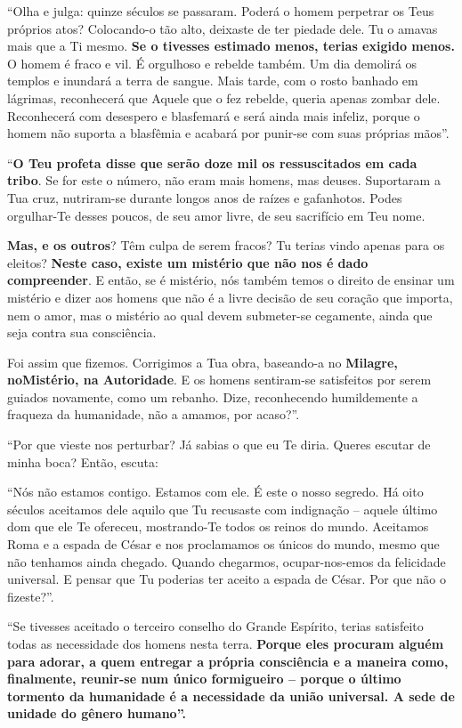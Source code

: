 ``Olha e julga: quinze séculos se passaram. Poderá o homem perpetrar os
Teus próprios atos? Colocando-o tão alto, deixaste de ter piedade dele.
Tu o amavas mais que a Ti mesmo. \textbf{Se o tivesses estimado menos,
terias exigido menos.} O homem é fraco e vil. É orgulhoso e rebelde
também. Um dia demolirá os templos e inundará a terra de sangue. Mais
tarde, com o rosto banhado em lágrimas, reconhecerá que Aquele que o fez
rebelde, queria apenas zombar dele. Reconhecerá com desespero e
blasfemará e será ainda mais infeliz, porque o homem não suporta a
blasfêmia e acabará por punir-se com suas próprias mãos''.

``\textbf{O Teu profeta disse que serão doze mil os ressuscitados em
cada tribo}. Se for este o número, não eram mais homens, mas deuses.
Suportaram a Tua cruz, nutriram-se durante longos anos de raízes e
gafanhotos. Podes orgulhar-Te desses poucos, de seu amor livre, de seu
sacrifício em Teu nome.

\textbf{Mas, e os outros}? Têm culpa de serem fracos? Tu terias vindo
apenas para os eleitos? \textbf{Neste caso, existe um mistério que não
nos é dado compreender}. E então, se é mistério, nós também temos o
direito de ensinar um mistério e dizer aos homens que não é a livre
decisão de seu coração que importa, nem o amor, mas o mistério ao qual
devem submeter-se cegamente, ainda que seja contra sua consciência.

Foi assim que fizemos. Corrigimos a Tua obra, baseando-a no
\textbf{Milagre, noMistério, na Autoridade}. E os homens sentiram-se
satisfeitos por serem guiados novamente, como um rebanho. Dize,
reconhecendo humildemente a fraqueza da humanidade, não a amamos, por
acaso?''.

``Por que vieste nos perturbar? Já sabias o que eu Te diria. Queres
escutar de minha boca? Então, escuta:

``Nós não estamos contigo. Estamos com ele. É este o nosso segredo. Há
oito séculos aceitamos dele aquilo que Tu recusaste com indignação --
aquele último dom que ele Te ofereceu, mostrando-Te todos os reinos do
mundo. Aceitamos Roma e a espada de César e nos proclamamos os únicos do
mundo, mesmo que não tenhamos ainda chegado. Quando chegarmos,
ocupar-nos-emos da felicidade universal. E pensar que Tu poderias ter
aceito a espada de César. Por que não o fizeste?''.

``Se tivesses aceitado o terceiro conselho do Grande Espírito, terias
satisfeito todas as necessidade dos homens nesta terra. \textbf{Porque
eles procuram alguém para adorar, a quem entregar a própria consciência
e a maneira como, finalmente, reunir-se num único formigueiro -- porque
o último tormento da humanidade é a necessidade da união universal. A
sede de unidade do gênero humano''.}

